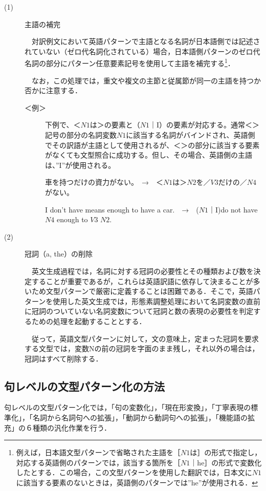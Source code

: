 \documentclass{nlp}
\begin{document}
\begin{description}
\item[(1)] 主語の補完

　対訳例文において英語パターンで主語となる名詞が日本語側では記述されていない（ゼロ代名詞化されている）場合，日本語側パターンのゼロ代名詞の部分にパターン任意要素記号を使用して主語を補完する\footnote{例えば，日本語文型パターンで省略された主語を［$N1$は］の形式で指定し，対応する英語側のパターンでは，該当する箇所を［$N1$｜he］の形式で変数化したとする．この場合，この文型パターンを使用した翻訳では，日本文に$N1$に該当する要素のないときは，英語側のパターンでは”he”が使用される．}．

　なお，この処理では，重文や複文の主節と従属節が同一の主語を持つか否かに注意する．
\begin{description}
\item[＜例＞]下例で、＜$N1$は＞の要素と（$N1$｜I）の要素が対応する。通常＜＞記号の部分の名詞変数$N1$に該当する名詞がバインドされ、英語側でその訳語が主語として使用されるが、＜＞の部分に該当する要素がなくても文型照合に成功する。但し、その場合、英語側の主語は、”I”が使用される。

車を持つだけの資力がない。　→　＜$N1$は＞$N2$を／$V3$だけの／$N4$がない。

I don't have means enough to have a car.　→　($N1$｜I)do not have $N4$ enough to $V3$ $N2$.
\end{description}

\item[(2)] 冠詞（a, the）の削除

　英文生成過程では，名詞に対する冠詞の必要性とその種類および数を決定することが重要であるが，これらは英語訳語に依存して決まることが多いため文型パターンで厳密に定義することは困難である．そこで，英語パターンを使用した英文生成では，形態素調整処理において名詞変数の直前に冠詞のついていない名詞変数について冠詞と数の表現の必要性を判定するための処理を起動することとする．

　従って，英語文型パターンに対して，文の意味上，定まった冠詞を要求する文型では，変数Nの前の冠詞を字面のまま残し，それ以外の場合は，冠詞はすべて削除する．
\end{description}

\subsection{句レベルの文型パターン化の方法}
句レベルの文型パターン化では，「句の変数化」，「現在形変換」，「丁寧表現の標準化」，「名詞から名詞句への拡張」，「動詞から動詞句への拡張」，「機能語の拡充」の６種類の汎化作業を行う．
\end{document}
